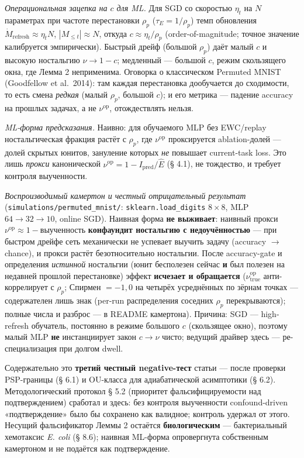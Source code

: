 \documentclass[pdflatex,sn-mathphys-ay]{sn-jnl}
\begin{document}
\emph{Операциональная зацепка на \(c\) для ML.} Для SGD со скоростью \(\eta_t\) на \(N\) параметрах при частоте перестановки \(\rho_p\) (\(\tau_E = 1/\rho_p\)) темп обновления \(\dot M_{\text{refresh}} \approx \eta_t N\), \(|M_{\le t}| \approx N\), откуда \(c \approx \eta_t/\rho_p\) (order-of-magnitude; точное значение калибруется эмпирически). Быстрый дрейф (большой \(\rho_p\)) даёт малый \(c\) и высокую ностальгию \(\nu \to 1-c\); медленный --- большой \(c\), режим скользящего окна, где Лемма 2 неприменима. Оговорка о классическом Permuted MNIST (Goodfellow et al.~2014): там каждая перестановка дообучается до сходимости, то есть смена \emph{редкая} (малый \(\rho_p\), большой \(c\)); и его метрика --- падение accuracy на прошлых задачах, а не \(\nu^{\text{op}}\), отождествлять нельзя.



\emph{ML-форма предсказания.} Наивно: для обучаемого MLP без EWC/replay ностальгическая фракция растёт с \(\rho_p\), где \(\nu^{\text{op}}\) проксируется ablation-долей --- долей скрытых юнитов, зануление которых \emph{не} повышает current-task loss. Это лишь \emph{прокси} канонической \(\nu^{\text{op}} = 1 - I_{\text{pred}}/\hat E\) (§ 4.1), не тождество, и требует контроля выученности.



\emph{Воспроизводимый камертон и честный отрицательный результат} (\texttt{simulations/permuted\_mnist/}: \texttt{sklearn.load\_digits} \(8\times8\), MLP \(64\to32\to10\), online SGD). Наивная форма \textbf{не выживает}: наивный прокси \(\nu^{\text{op}} \approx 1 - \text{выученность}\) \textbf{конфаундит ностальгию с недоучённостью} --- при быстром дрейфе сеть механически не успевает выучить задачу (accuracy \(\to\) chance), и прокси растёт безотносительно ностальгии. После accuracy-gate и определения \emph{истинной} ностальгии (юнит бесполезен сейчас \textbf{и} был полезен на недавней прошлой перестановке) эффект \textbf{исчезает и обращается} (\(\nu^{\text{op}}_{\text{true}}\) анти-коррелирует с \(\rho_p\); Спирмен \(= -1{,}0\) на четырёх усреднённых по зёрнам точках --- содержателен лишь знак (per-run распределения соседних \(\rho_p\) перекрываются); полные числа и разброс --- в README камертона). Причина: SGD --- high-refresh обучатель, постоянно в режиме большого \(c\) (скользящее окно), поэтому малый MLP \textbf{не} инстанциирует закон \(c \to \nu\) чисто; ведущий драйвер здесь --- ре-специализация при долгом dwell.



Содержательно это \textbf{третий честный negative-тест} статьи --- после проверки PSP-границы (§ 6.1) и OU-класса для адиабатической асимптотики (§ 6.2). Методологический протокол § 5.2 (приоритет фальсифицируемости над подтверждением) сработал и здесь: без контроля выученности confound-driven «подтверждение» было бы сохранено как валидное; контроль удержал от этого. Несущий фальсификатор Леммы 2 остаётся \textbf{биологическим} --- бактериальный хемотаксис \emph{E. coli} (§ 8.6); наивная ML-форма опровергнута собственным камертоном и не подаётся как подтверждение.
\end{document}
